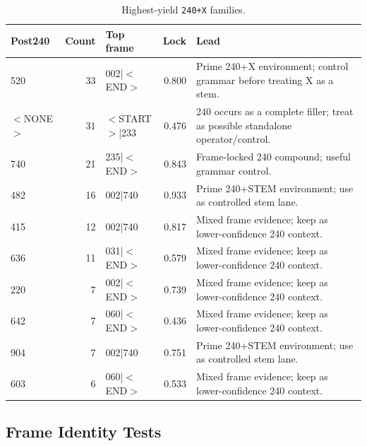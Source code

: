 \begin{table}[htbp]
\centering
\scriptsize
\begin{tabular}{lrlrp{}}
\toprule
\textbf{Post240} & \textbf{Count} & \textbf{Top frame} & \textbf{Lock} & \textbf{Lead} \\
\midrule
520 & 33 & 002|$<$END$>$ & 0.800 & Prime 240+X environment; control grammar before treating X as a stem. \\
$<$NONE$>$ & 31 & $<$START$>$|233 & 0.476 & 240 occurs as a complete filler; treat as possible standalone operator/control. \\
740 & 21 & 235|$<$END$>$ & 0.843 & Frame-locked 240 compound; useful grammar control. \\
482 & 16 & 002|740 & 0.933 & Prime 240+STEM environment; use as controlled stem lane. \\
415 & 12 & 002|740 & 0.817 & Mixed frame evidence; keep as lower-confidence 240 context. \\
636 & 11 & 031|$<$END$>$ & 0.579 & Mixed frame evidence; keep as lower-confidence 240 context. \\
220 & 7 & 002|$<$END$>$ & 0.739 & Mixed frame evidence; keep as lower-confidence 240 context. \\
642 & 7 & 060|$<$END$>$ & 0.436 & Mixed frame evidence; keep as lower-confidence 240 context. \\
904 & 7 & 002|740 & 0.751 & Prime 240+STEM environment; use as controlled stem lane. \\
603 & 6 & 060|$<$END$>$ & 0.533 & Mixed frame evidence; keep as lower-confidence 240 context. \\
\bottomrule
\end{tabular}
\caption{Highest-yield \texttt{240+X} families.}
\label{tab:grammar-keystone-240-families}
\end{table}

\subsection{Frame Identity Tests}

